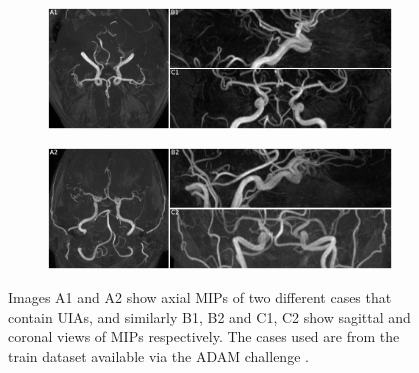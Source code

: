 \begin{figure}[h]
	\centering
	\begin{subfigure}{\linewidth}
		\includegraphics[width=\linewidth]{figures/mip_10021.png}
	\end{subfigure}
	\begin{subfigure}{\linewidth}
		\includegraphics[width=\linewidth]{figures/mip_10028.png}
	\end{subfigure}
	\caption[Maximum Intensity Projections of two positive cases.]{Images A1 and A2 show axial MIPs of two different cases that contain UIAs, and similarly B1, B2 and C1, C2 show sagittal and coronal views of MIPs respectively. The cases used are from the train dataset available via the ADAM challenge \cite{Timmins2020}.}
	\label{fig:mip}
\end{figure}

